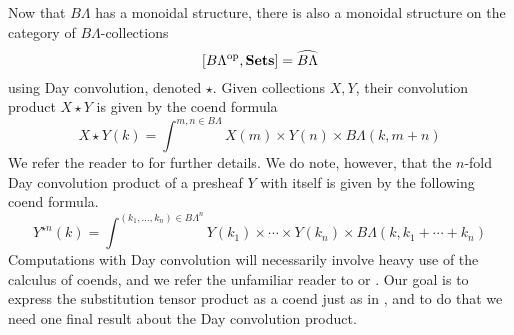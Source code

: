 Now that $B\Lambda$ has a monoidal structure, there is also a monoidal structure on the category of $B\Lambda$-collections
  \[
    [B\Lambda^{\textrm{op}}, \mathbf{Sets}] = \widehat{B\Lambda}
  \]
using Day convolution, denoted $\star$. Given collections $X, Y$, their convolution product $X \star Y$ is given by the coend formula
  \[
    X \star Y (k) = \int^{m,n \in B\Lambda} X(m) \times Y(n) \times B\Lambda(k, m+n)
  \]
We refer the reader to \cite{day-thesis} for further details. We do note, however, that the $n$-fold Day convolution product of a presheaf $Y$ with itself is given by the following coend formula.
  \[
    Y^{\star n}(k) = \int^{(k_{1}, \ldots, k_{n}) \in B\Lambda^{n}} Y(k_{1}) \times \cdots \times Y(k_{n}) \times B\Lambda(k, k_{1} + \cdots + k_{n})
  \]
Computations with Day convolution will necessarily involve heavy use of the calculus of coends, and we refer the unfamiliar reader to \cite{maclane-catwork} or \cite{loregian}. Our goal is to express the substitution tensor product as a coend just as in \cite{kelly-op}, and to do that we need one final result about the Day convolution product.

